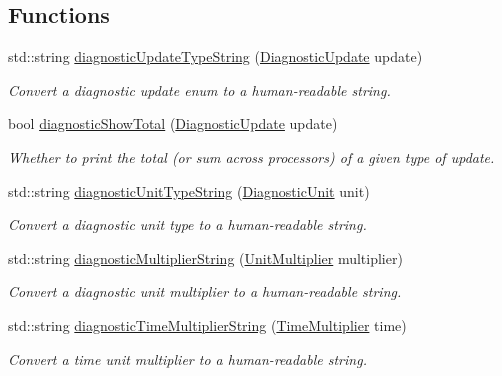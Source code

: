 \subsection*{Functions}
\begin{DoxyCompactItemize}
\item 
std\+::string \hyperlink{namespacevt_1_1runtime_1_1component_ac34e12698b9c3d80f4697368a28b763b}{diagnostic\+Update\+Type\+String} (\hyperlink{namespacevt_1_1runtime_1_1component_a896637e6e183a909a17bfd8d3943c206}{Diagnostic\+Update} update)
\begin{DoxyCompactList}\small\item\em Convert a diagnostic update enum to a human-\/readable string. \end{DoxyCompactList}\item 
bool \hyperlink{namespacevt_1_1runtime_1_1component_a58591fba884221f50715e723f089562b}{diagnostic\+Show\+Total} (\hyperlink{namespacevt_1_1runtime_1_1component_a896637e6e183a909a17bfd8d3943c206}{Diagnostic\+Update} update)
\begin{DoxyCompactList}\small\item\em Whether to print the total (or sum across processors) of a given type of update. \end{DoxyCompactList}\item 
std\+::string \hyperlink{namespacevt_1_1runtime_1_1component_ad4ad0d77bfcfe9f714950cb8ccc5f93a}{diagnostic\+Unit\+Type\+String} (\hyperlink{namespacevt_1_1runtime_1_1component_a99ec18b08862c712176126bb7d0e307a}{Diagnostic\+Unit} unit)
\begin{DoxyCompactList}\small\item\em Convert a diagnostic unit type to a human-\/readable string. \end{DoxyCompactList}\item 
std\+::string \hyperlink{namespacevt_1_1runtime_1_1component_ae89639375d5503f4ea10b677915903c8}{diagnostic\+Multiplier\+String} (\hyperlink{namespacevt_1_1runtime_1_1component_a59a0e5faf8c985e274127e0d0cef2193}{Unit\+Multiplier} multiplier)
\begin{DoxyCompactList}\small\item\em Convert a diagnostic unit multiplier to a human-\/readable string. \end{DoxyCompactList}\item 
std\+::string \hyperlink{namespacevt_1_1runtime_1_1component_a99c037ee6312b9c934b3606e316e0539}{diagnostic\+Time\+Multiplier\+String} (\hyperlink{namespacevt_1_1runtime_1_1component_a7c43622f1c2cc49bc223523837649b1a}{Time\+Multiplier} time)
\begin{DoxyCompactList}\small\item\em Convert a time unit multiplier to a human-\/readable string. \end{DoxyCompactList}\end{DoxyCompactItemize}


